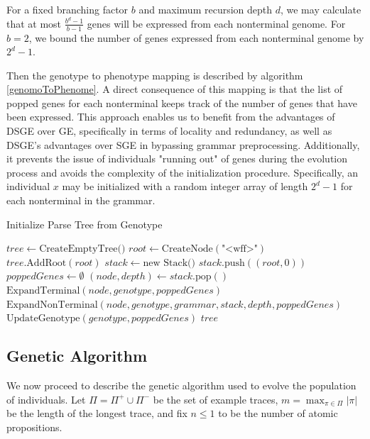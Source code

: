 \documentclass[runningheads]{llncs}
\begin{document}
For a fixed branching factor $b$ and maximum recursion depth $d$, we may calculate that at most $\frac{b^d - 1}{b - 1}$ genes will be expressed from each nonterminal genome.
For $b = 2$, we bound the number of genes expressed from each nonterminal genome by $2^d-1$.

Then the genotype to phenotype mapping is described by algorithm \ref{genomoToPhenome}. 
A direct consequence of this mapping is that the list of popped genes for each nonterminal keeps track of the number of genes that have been expressed. 
This approach enables us to benefit from the advantages of DSGE over GE, specifically in terms of locality and redundancy, as well as DSGE's advantages over SGE in bypassing grammar preprocessing. 
Additionally, it prevents the issue of individuals "running out" of genes during the evolution process and avoids the complexity of the initialization procedure.
Specifically, an individual $x$ may be initialized with a random integer array of length $2^d-1$ for each nonterminal in the grammar. 

\begin{algorithm}
\caption{Initialize Parse Tree from Genotype}
\begin{algorithmic}[1]
\label{genomoToPhenome}
    \State $tree \gets \text{CreateEmptyTree()}$
    \State $root \gets \text{CreateNode}(\text{"<wff>"})$
    \State $tree.\text{AddRoot}(root)$
    \State $stack \gets \text{new Stack()}$
    \State $stack.\text{push}((root, 0))$ 
    \State $poppedGenes \gets \emptyset$
        \State $(node, depth) \gets stack.\text{pop}()$
            \State $\text{ExpandTerminal}(node, genotype, poppedGenes)$
            \State $\text{ExpandNonTerminal}(node, genotype, grammar, stack, depth, poppedGenes)$
        \EndIf
    \EndWhile
    \State $\text{UpdateGenotype}(genotype, poppedGenes)$
    \State \Return $tree$
\EndProcedure
\end{algorithmic}
\end{algorithm}

\subsection{Genetic Algorithm}
We now proceed to describe the genetic algorithm used to evolve the population of individuals. Let $\Pi = \Pi^+ \cup \Pi^-$ be the set of example traces, $m = \max_{\pi \in \Pi} |\pi|$ be the length of the longest trace, and fix $n \leq 1$ to be the number of atomic propositions.
\end{document}
